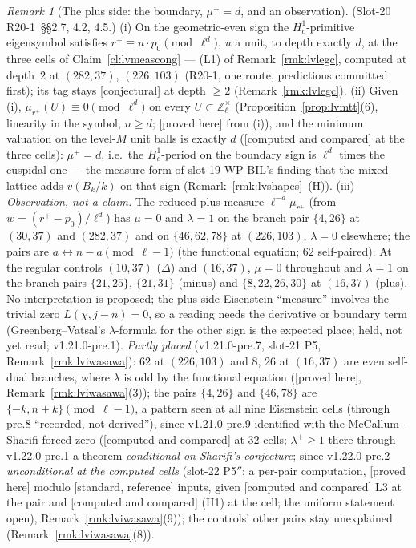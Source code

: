\documentclass[11pt]{article}
\theoremstyle{remark}
\newtheorem{remark}[theorem]{Remark}
\newcommand{\Z}{\mathbb{Z}}
\newcommand{\PROVED}{\textsf{[proved here]}}
\newcommand{\STD}{\textsf{[standard, reference]}}
\newcommand{\CONJ}{\textsf{[conjectural]}}
\newcommand{\CMPD}{\textsf{[computed and compared]}}   %
\begin{document}
\begin{remark}[The plus side: the boundary, $\mu^{+}=d$, and an observation]\label{rmk:lvmeasplus}
(Slot-20 R20-1~\S\S2.7, 4.2, 4.5.) (i) On the geometric-even sign the $H^{1}_c$-primitive eigensymbol satisfies $r^{+}\equiv u\cdot p_0\pmod{\ell^{d}}$, $u$ a unit, to depth exactly
$d$, at the three cells of Claim~\ref{cl:lvmeascong} --- (L1) of Remark~\ref{rmk:lvlegc}, computed at depth~$2$ at $(282,37)$, $(226,103)$ (R20-1, one route, predictions committed
first); its tag stays \CONJ{} at depth $\ge2$ (Remark~\ref{rmk:lvlegc}). (ii) Given (i), $\mu_{r^{+}}(U)\equiv0\pmod{\ell^{d}}$ on every $U\subset\Z_\ell^{\times}$ (Proposition~\ref{prop:lvmtt}(6),
linearity in the symbol, $n\ge d$; \PROVED{} from (i)), and the minimum valuation on the level-$M$ unit balls is exactly $d$ (\CMPD{} at the three cells): $\mu^{+}=d$, i.e.\ the $H^{1}_c$-period on the
boundary sign is $\ell^{d}$ times the cuspidal one --- the measure form of slot-19 WP-BIL's finding that the mixed lattice adds $v(B_k/k)$ on that sign
(Remark~\ref{rmk:lvshapes}~(H)). (iii) \emph{Observation, not a claim.} The reduced plus measure $\ell^{-d}\mu_{r^{+}}$ (from $w=(r^{+}-p_0)/\ell^{d}$) has $\mu=0$ and $\lambda=1$ on the
branch pair $\{4,26\}$ at $(30,37)$ and $(282,37)$ and on $\{46,62,78\}$ at $(226,103)$, $\lambda=0$ elsewhere; the pairs are $a\leftrightarrow n-a\pmod{\ell-1}$ (the functional
equation; $62$ self-paired). At the regular controls $(10,37)$ ($\Delta$) and $(16,37)$, $\mu=0$ throughout and $\lambda=1$ on the branch pairs $\{21,25\}$, $\{21,31\}$ (minus) and
$\{8,22,26,30\}$ at $(16,37)$ (plus). No interpretation is proposed; the plus-side Eisenstein ``measure'' involves the trivial zero $L(\chi,j-n)=0$, so a reading needs the
derivative or boundary term (Greenberg--Vatsal's $\lambda$-formula for the other sign is the expected place; held, not yet read; v1.21.0-pre.1). \emph{Partly placed}
(v1.21.0-pre.7, slot-21 P5, Remark~\ref{rmk:lviwasawa}): $62$ at $(226,103)$ and $8$, $26$ at $(16,37)$ are even self-dual branches, where $\lambda$ is odd by the functional equation (\PROVED,
Remark~\ref{rmk:lviwasawa}(3)); the pairs $\{4,26\}$ and $\{46,78\}$ are $\{-k,n+k\}\pmod{\ell-1}$, a pattern seen at all nine Eisenstein cells (through pre.8 ``recorded, not derived''), since v1.21.0-pre.9 identified with the
McCallum--Sharifi forced zero (\CMPD{} at $32$ cells; $\lambda^{+}\ge1$ there through v1.22.0-pre.1 a theorem \emph{conditional on Sharifi's conjecture}; since v1.22.0-pre.2 \emph{unconditional at the computed cells} (slot-22 P5$''$; a per-pair computation, \PROVED{} modulo \STD{} inputs, given \CMPD{} L3 at the pair and \CMPD{} (H1) at the cell; the uniform statement open), Remark~\ref{rmk:lviwasawa}(9)); the controls' other pairs stay unexplained (Remark~\ref{rmk:lviwasawa}(8)).
\end{remark}
\end{document}
